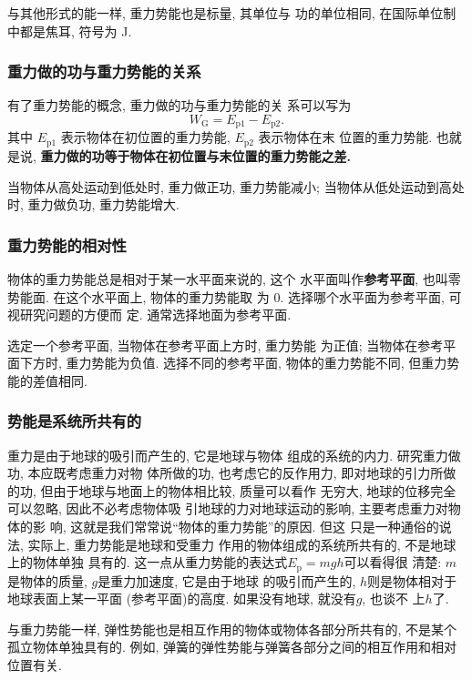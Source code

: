 \documentclass[11pt,a4paper]{ctexbook}
\begin{document}
与其他形式的能一样, 重力势能也是标量, 其单位与
功的单位相同, 在国际单位制中都是焦耳, 符号为 J.

\subsubsection{重力做的功与重力势能的关系}
\label{重力势能小节}

有了重力势能的概念, 重力做的功与重力势能的关
系可以写为
$$W_\text{G} = E_{\text{p}1} - E_{\text{p}2}.$$
其中 $E_{\text{p}1}$ 表示物体在初位置的重力势能, $E_{\text{p}2}$ 表示物体在末
位置的重力势能. 也就是说, \textbf{重力做的功等于物体在初位置与末位置的重力势能之差.}

当物体从高处运动到低处时, 重力做正功, 重力势能减小;
当物体从低处运动到高处时, 重力做负功, 重力势能增大.

\subsubsection{重力势能的相对性}

物体的重力势能总是相对于某一水平面来说的, 这个
水平面叫作\textbf{参考平面}, 也叫零势能面. 在这个水平面上, 物体的重力势能取
为 0. 选择哪个水平面为参考平面, 可视研究问题的方便而
定. 通常选择地面为参考平面.

选定一个参考平面, 当物体在参考平面上方时, 重力势能
为正值; 当物体在参考平面下方时, 重力势能为负值. 选择不同的参考平面, 物体的重力势能不同,
但重力势能的差值相同.

\subsubsection{势能是系统所共有的}
重力是由于地球的吸引而产生的, 它是地球与物体
组成的系统的内力. 研究重力做功, 本应既考虑重力对物
体所做的功, 也考虑它的反作用力, 即对地球的引力所做
的功, 但由于地球与地面上的物体相比较, 质量可以看作
无穷大, 地球的位移完全可以忽略, 因此不必考虑物体吸
引地球的力对地球运动的影响, 主要考虑重力对物体的影
响, 这就是我们常常说``物体的重力势能''的原因. 但这
只是一种通俗的说法, 实际上, 重力势能是地球和受重力
作用的物体组成的系统所共有的, 不是地球上的物体单独
具有的. 这一点从重力势能的表达式$E_\mathrm{p} = mgh$可以看得很
清楚: $m$是物体的质量, $g$是重力加速度, 它是由于地球
的吸引而产生的, $h$则是物体相对于地球表面上某一平面
(参考平面)的高度. 如果没有地球, 就没有$g$, 也谈不
上$h$了.

与重力势能一样, 弹性势能也是相互作用的物体或物体各部分所共有的, 不是某个孤立物体单独具有的. 例如, 弹簧的弹性势能与弹簧各部分之间的相互作用和相对位置有关.
\end{document}
